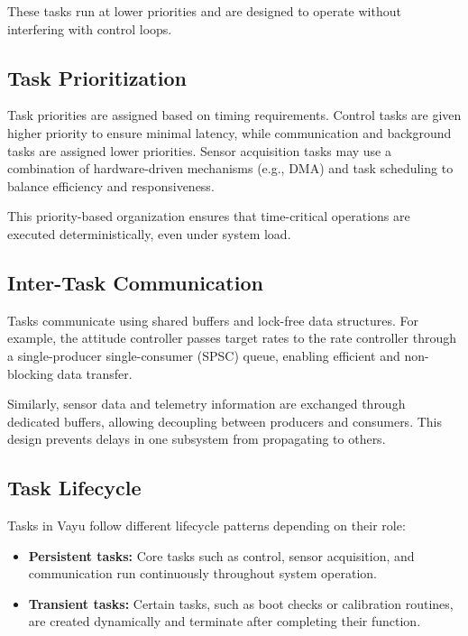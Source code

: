 These tasks run at lower priorities and are designed to operate without interfering with control loops.

\subsection{Task Prioritization}

Task priorities are assigned based on timing requirements. Control tasks are given higher priority to ensure minimal latency, while communication and background tasks are assigned lower priorities. Sensor acquisition tasks may use a combination of hardware-driven mechanisms (e.g., DMA) and task scheduling to balance efficiency and responsiveness.

This priority-based organization ensures that time-critical operations are executed deterministically, even under system load.

\subsection{Inter-Task Communication}

Tasks communicate using shared buffers and lock-free data structures. For example, the attitude controller passes target rates to the rate controller through a single-producer single-consumer (SPSC) queue, enabling efficient and non-blocking data transfer.

Similarly, sensor data and telemetry information are exchanged through dedicated buffers, allowing decoupling between producers and consumers. This design prevents delays in one subsystem from propagating to others.

\subsection{Task Lifecycle}

Tasks in Vayu follow different lifecycle patterns depending on their role:

\begin{itemize}
    \item \textbf{Persistent tasks:}  
    Core tasks such as control, sensor acquisition, and communication run continuously throughout system operation.

    \item \textbf{Transient tasks:}  
    Certain tasks, such as boot checks or calibration routines, are created dynamically and terminate after completing their function.
\end{itemize}

